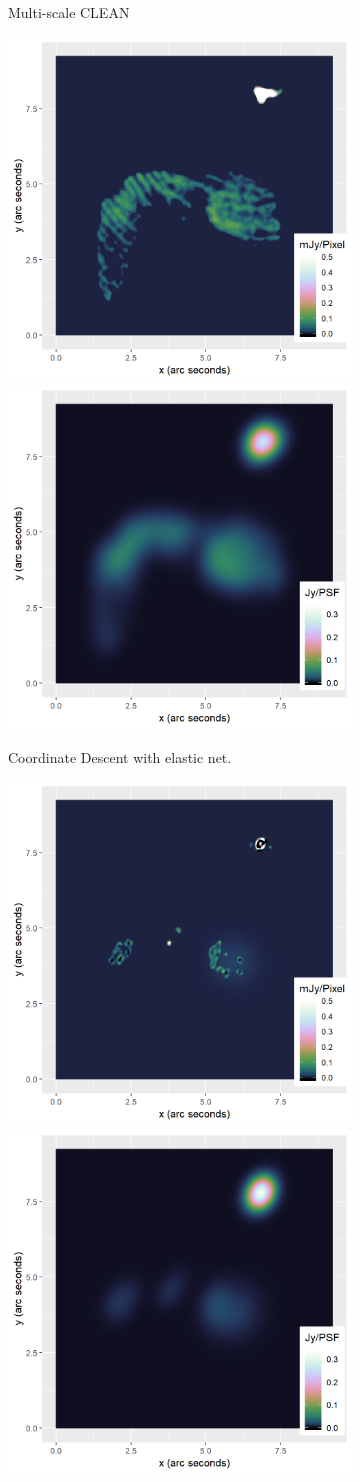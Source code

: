 \begin{figure}[!ht]
\begin{subfigure}[b]{0.82\linewidth}
\begin{subfigure}{0.45\linewidth}
		\end{subfigure}
		\caption{Multi-scale CLEAN}
	\end{subfigure}
	\begin{subfigure}[b]{0.82\linewidth}
		\centering
		\includegraphics[width=0.45\linewidth]{./chapters/10.results/SerialCD/CD-Calibration.png}
		\includegraphics[width=0.45\linewidth]{./chapters/10.results/SerialCD/CD-image-Calibration.png}
		\caption{Coordinate Descent with elastic net.}
	\end{subfigure}
	\begin{subfigure}[b]{0.82\linewidth}
		\centering
		\includegraphics[width=0.45\linewidth]{./chapters/10.results/iuwt/iuwt-Calibration.png}
		\includegraphics[width=0.45\linewidth]{./chapters/10.results/iuwt/iuwt-image-Calibration.png}

\end{subfigure}
\end{figure}
